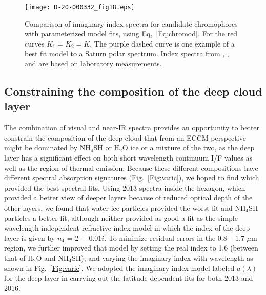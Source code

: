 \documentclass[article,11pt]{emulateapj}
\def\hto{H$_2$O }
\def\mum{$\mu$m }
\def\hto{H$_2$O }
\def\nhfsh{NH$_4$SH }
\def\nhfshx{NH$_4$SH}
\begin{document}
\begin{figure}[!htb]\centering
\texttt{[image: D-20-000332\_fig18.eps]}
\caption{Comparison of imaginary index spectra for
candidate chromophores with parameterized model fits,
using Eq,\ \ref{Eq:chromod}. For the red curves $K_1 = K_2 = K$. The purple dashed curve is one example
of a best fit model to a Saturn polar spectrum. Index spectra from
\cite{Noy1981}, \cite{Khare1993}, and \cite{Carlson2016} are based
on laboratory measurements.}
\label{Fig:chromod}
\end{figure} 


\subsection{Constraining the composition of the deep cloud layer}\label{Sec:deep}

The combination of visual and near-IR spectra provides an opportunity to
better constrain the composition of the deep cloud that from an ECCM perspective
might be dominated by \nhfsh or H$_2$O ice or a mixture of the two, as the deep
layer has a significant effect on both short wavelength continuum I/F values
as well as the region of thermal emission.  Because these different compositions
have different spectral absorption signatures (Fig.\ \ref{Fig:varic}), we hoped to find which
provided the best spectral fits.   Using 2013 spectra inside the hexagon,
which provided a better view of deeper layers because of reduced optical depth
of the other layers, we found that water ice particles provided the worst
fit and \nhfsh particles a better fit, although neither provided as good a
fit as the simple wavelength-independent refractive index model in which
the index of the deep layer is given by $n_4$ = 2 + 0.01$i$. To minimize
residual errors in the 0.8 -- 1.7 \mum region, we further improved
that model by setting the real index to 1.6 (between that of \hto and \nhfshx),
and varying the imaginary index with wavelength as shown in Fig.\ \ref{Fig:varic}.
We adopted the imaginary index model labeled $a(\lambda)$ for the deep layer in
carrying out the latitude dependent fits for both 2013 and 2016.  
\end{document}
